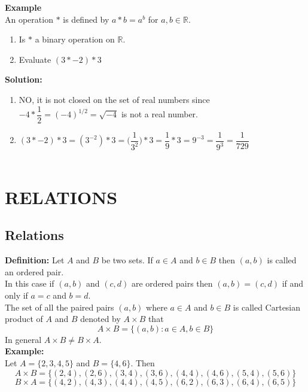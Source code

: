 \documentclass[11pt,a4paper]{article}
\begin{document}
\textbf{Example}\\ An operation $*$ is defined by $a*b=a^b$ for $a,b \in \mathbb{R}$.
\begin{enumerate}
\item[(i).] Is $*$ a binary operation on $\mathbb{R}$.
\item[(ii).] Evaluate $(3*-2)*3$\\
\end{enumerate}


\textbf{Solution:}
\begin{enumerate}
\item[(i).] NO, it is not closed on the set of real numbers since $-4*\dfrac{1}{2}=(-4)^{1/2}=\sqrt{-4}$ is not a real number.
\item[(ii).] $(3*-2)*3=(3^{-2})*3=\bigg(\dfrac{1}{3^2}\bigg)*3=\dfrac{1}{9}*3=9^{-3}=\dfrac{1}{9^3}=\dfrac{1}{729}$\\\\
\end{enumerate}












\pagebreak
\section{RELATIONS}

\subsection{Relations}
\textbf{Definition:} Let $A$ and $B$ be two sets. If $a\in A$ and $b\in B$ then $(a,b)$ is called an ordered pair.\\
In this case if $(a,b)$ and $(c,d)$ are ordered pairs then $(a,b)=(c,d)$ if and only if $a=c$ and $b=d$.\\

The set of all the paired pairs $(a,b)$ where $a\in A$ and $b\in B$ is called Cartesian product of $A$ and $B$ denoted by $A\times B$ that $$ A\times B = \{(a,b):a\in A, b\in B\}$$ In general $A\times B \neq B\times A$.\\

\textbf{Example:}\\
Let $A=\{2,3,4,5\}$ and $B=\{4,6\}$. Then 
$$A\times B =\{(2,4),(2,6),(3,4),(3,6),(4,4),(4,6),(5,4),(5,6)\}$$
$$B\times A= \{(4,2),(4,3),(4,4),(4,5),(6,2),(6,3),(6,4),(6,5)\}$$\\
\end{document}
